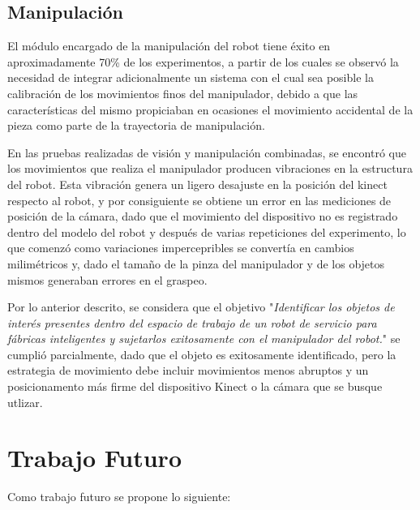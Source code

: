 \subsection{Manipulación}
El módulo encargado de la manipulación del robot tiene éxito en aproximadamente 70\% de los experimentos, a partir de los cuales se observó la necesidad de integrar adicionalmente un sistema con el cual sea posible la calibración de los movimientos finos del manipulador, debido a que las características del mismo propiciaban en ocasiones el movimiento accidental de la pieza como parte de la trayectoria de manipulación. 

En las pruebas realizadas de visión y manipulación combinadas, se encontró que los movimientos que realiza el manipulador producen vibraciones en la estructura del robot. Esta vibración genera un ligero desajuste en la posición del kinect respecto al robot, y por consiguiente se obtiene un error en las mediciones de posición de la cámara, dado que el movimiento del dispositivo no es registrado dentro del modelo del robot y después de varias repeticiones del experimento, lo que comenzó como variaciones impercepribles se convertía en cambios milimétricos y, dado el tamaño de la pinza del manipulador y de los objetos mismos generaban errores en el graspeo.


Por lo anterior descrito, se considera que el objetivo "\textit{Identificar los objetos de interés presentes dentro del espacio de trabajo de un robot de servicio para fábricas inteligentes y sujetarlos exitosamente con el manipulador del robot.}" se cumplió parcialmente, dado que el objeto es exitosamente identificado, pero la estrategia de movimiento debe incluir movimientos menos abruptos y un posicionamento más firme del dispositivo Kinect o la cámara que se busque utlizar.

\section{Trabajo Futuro}
Como trabajo futuro se propone lo siguiente:


